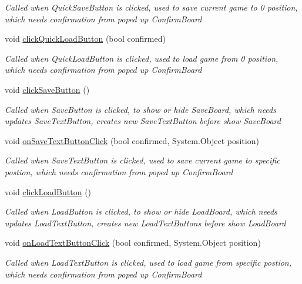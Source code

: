 \begin{DoxyCompactItemize}
\begin{DoxyCompactList}\small\item\em Called when Quick\+Save\+Button is clicked, used to save current game to 0 position, which needs confirmation from poped up Confirm\+Board \end{DoxyCompactList}\item 
void \hyperlink{class_world_control_a111e414ac0160d8c23a3a16660f1de68}{click\+Quick\+Load\+Button} (bool confirmed)
\begin{DoxyCompactList}\small\item\em Called when Quick\+Load\+Button is clicked, used to load game from 0 position, which needs confirmation from poped up Confirm\+Board \end{DoxyCompactList}\item 
void \hyperlink{class_world_control_aa5146c1b9154a701c63ed09b6ad996f5}{click\+Save\+Button} ()
\begin{DoxyCompactList}\small\item\em Called when Save\+Button is clicked, to show or hide Save\+Board, which needs updates Save\+Text\+Button, creates new Save\+Text\+Button before show Save\+Board \end{DoxyCompactList}\item 
void \hyperlink{class_world_control_a4deccd456be82aeee5b1bcf63a450127}{on\+Save\+Text\+Button\+Click} (bool confirmed, System.\+Object position)
\begin{DoxyCompactList}\small\item\em Called when Save\+Text\+Button is clicked, used to save current game to specific postion, which needs confirmation from poped up Confirm\+Board \end{DoxyCompactList}\item 
void \hyperlink{class_world_control_aac00c4b9104aaac8856742e80c78bb02}{click\+Load\+Button} ()
\begin{DoxyCompactList}\small\item\em Called when Load\+Button is clicked, to show or hide Load\+Board, which needs updates Load\+Text\+Button, creates new Load\+Text\+Buttons before show Load\+Board \end{DoxyCompactList}\item 
void \hyperlink{class_world_control_aca2bcd2390e1823074e01acacb8bf012}{on\+Load\+Text\+Button\+Click} (bool confirmed, System.\+Object position)
\begin{DoxyCompactList}\small\item\em Called when Load\+Text\+Button is clicked, used to load game from specific postion, which needs confirmation from poped up Confirm\+Board \end{DoxyCompactList}\item 

\end{DoxyCompactItemize}
